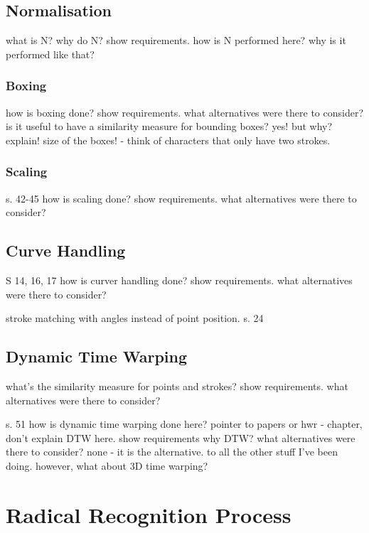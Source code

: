 \subsection{Normalisation}
\label{sec:hwre:normalisation}

what is N?
why do N?
show requirements.
how is N performed here?
why is it performed like that?

\subsubsection{Boxing}
\label{sec:hwre:boxing}
how is boxing done?
show requirements.
what alternatives were there to consider?
is it useful to have a similarity measure for bounding boxes?
yes! but why? explain!
size of the boxes! - think of characters that only have two strokes.

\subsubsection{Scaling}
\label{sec:hwre:scaling}

s. 42-45
how is scaling done?
show requirements.
what alternatives were there to consider?

\subsection{Curve Handling}
\label{sec:hwre:curvehandling}

S 14, 16, 17
how is curver handling done?
show requirements.
what alternatives were there to consider?

stroke matching with angles instead of point position.
s. 24

\subsection{Dynamic Time Warping}
\label{sec:hwre:dynamictimewarping}

what's the similarity measure for
points and strokes?
show requirements.
what alternatives were there to consider?

s. 51
how is dynamic time warping done here?
pointer to papers or hwr - chapter, don't explain DTW here.
show requirements
why DTW?
what alternatives were there to consider?
none - it is the alternative.
to all the other stuff I've been doing.
however, what about 3D time warping?


\section{Radical Recognition Process}
\label{sec:hwre:radicalrecognitionprocess}

